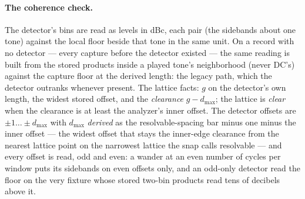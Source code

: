 \documentclass[11pt,a4paper]{article}
\begin{document}
\paragraph{The coherence check.}
\label{sec:imd-coherence}
The detector's bins are read as levels in dBc, each pair (the sidebands
about one tone) against the local floor beside that tone in the same
unit. On a record with no detector --- every capture before the detector
existed --- the same reading is built from the stored products inside a
played tone's neighborhood (never DC's) against the capture floor at the
derived length: the legacy path, which the detector outranks whenever
present. The lattice facts: $g$ on the detector's own length, the widest
stored offset, and the \emph{clearance} $g - d_{\max}$; the lattice is
\emph{clear} when the clearance is at least the analyzer's inner offset.
The detector offsets are $\pm 1 \ldots \pm d_{\max}$ with $d_{\max}$
\emph{derived} as the resolvable-spacing bar minus one minus the inner
offset --- the widest offset that stays the inner-edge clearance from the
nearest lattice point on the narrowest lattice the snap calls resolvable
--- and every offset is read, odd and even: a wander at an even number of
cycles per window puts its sidebands on even offsets only, and an
odd-only detector read the floor on the very fixture whose stored two-bin
products read tens of decibels above it.
\end{document}
